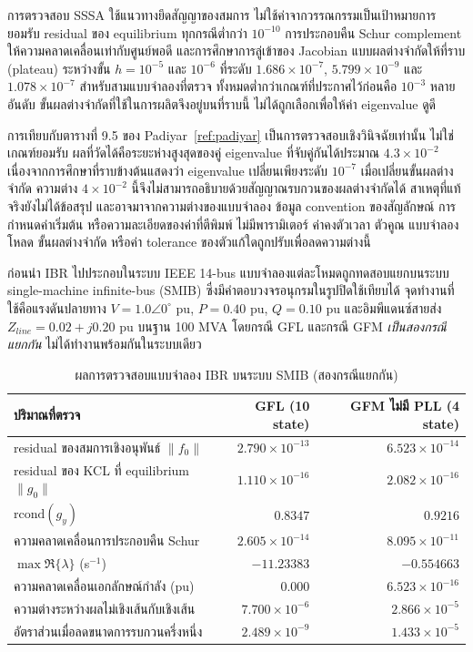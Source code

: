 \documentclass[12pt,a4paper]{article}
\newcommand{\templatesubheading}[1]{%
  \vspace{0.35em}\noindent{\color{academicblue}\rule{0.055\textwidth}{1.4pt}\hspace{0.45em}\fontsize{20}{22}\selectfont\bfseries #1}\par\vspace{0.12em}}
\newcommand{\tableheader}{\rowcolor{tablehead}}
\begin{document}
การตรวจสอบ SSSA ใช้แนวทางยึดสัญญาของสมการ ไม่ใช้ค่าจากวรรณกรรมเป็นเป้าหมายการยอมรับ
residual ของ equilibrium ทุกกรณีต่ำกว่า $10^{-10}$ การประกอบคืน Schur complement ให้ความคลาดเคลื่อนเท่ากับศูนย์พอดี และการศึกษาการลู่เข้าของ Jacobian แบบผลต่างจำกัดให้ที่ราบ (plateau) ระหว่างขั้น $h=10^{-5}$ และ $10^{-6}$ ที่ระดับ $1.686\times10^{-7}$, $5.799\times10^{-9}$ และ $1.078\times10^{-7}$ สำหรับสามแบบจำลองที่ตรวจ ทั้งหมดต่ำกว่าเกณฑ์ที่ประกาศไว้ก่อนคือ $10^{-3}$ หลายอันดับ ขั้นผลต่างจำกัดที่ใช้ในการผลิตจึงอยู่บนที่ราบนี้ ไม่ได้ถูกเลือกเพื่อให้ค่า eigenvalue ดูดี

การเทียบกับตารางที่ 9.5 ของ Padiyar~\ref{ref:padiyar} เป็นการตรวจสอบเชิงวินิจฉัยเท่านั้น ไม่ใช่เกณฑ์ยอมรับ ผลที่วัดได้คือระยะห่างสูงสุดของคู่ eigenvalue ที่จับคู่กันได้ประมาณ $4.3\times10^{-2}$ เนื่องจากการศึกษาที่ราบข้างต้นแสดงว่า eigenvalue เปลี่ยนเพียงระดับ $10^{-7}$ เมื่อเปลี่ยนขั้นผลต่างจำกัด ความต่าง $4\times10^{-2}$ นี้จึงไม่สามารถอธิบายด้วยสัญญาณรบกวนของผลต่างจำกัดได้ สาเหตุที่แท้จริงยังไม่ได้ข้อสรุป และอาจมาจากความต่างของแบบจำลอง ข้อมูล convention ของสัญลักษณ์ การกำหนดค่าเริ่มต้น หรือความละเอียดของค่าที่ตีพิมพ์ ไม่มีพารามิเตอร์ ค่าคงตัวเวลา ตัวคูณ แบบจำลองโหลด ขั้นผลต่างจำกัด หรือค่า tolerance ของตัวแก้ใดถูกปรับเพื่อลดความต่างนี้

\templatesubheading{13. การทดสอบแบบจำลอง IBR บนระบบ SMIB}
ก่อนนำ IBR ไปประกอบในระบบ IEEE 14-bus แบบจำลองแต่ละโหมดถูกทดสอบแยกบนระบบ single-machine infinite-bus (SMIB) ซึ่งมีคำตอบวงจรอนุกรมในรูปปิดใช้เทียบได้ จุดทำงานที่ใช้คือแรงดันปลายทาง $V=1.0\angle0^{\circ}$ pu, $P=0.40$ pu, $Q=0.10$ pu และอิมพีแดนซ์สายส่ง $Z_{line}=0.02+j0.20$ pu บนฐาน 100 MVA โดยกรณี GFL และกรณี GFM \emph{เป็นสองกรณีแยกกัน} ไม่ได้ทำงานพร้อมกันในระบบเดียว
\begin{table}[H]
\centering
\caption{ผลการตรวจสอบแบบจำลอง IBR บนระบบ SMIB (สองกรณีแยกกัน)}
\label{tab:smib}
\begin{tabularx}{0.99\textwidth}{@{}X r r@{}}
\toprule
\tableheader ปริมาณที่ตรวจ & GFL (10 state) & GFM ไม่มี PLL (4 state) \\
\midrule
residual ของสมการเชิงอนุพันธ์ $\|f_0\|$ & $2.790\times10^{-13}$ & $6.523\times10^{-14}$ \\
residual ของ KCL ที่ equilibrium $\|g_0\|$ & $1.110\times10^{-16}$ & $2.082\times10^{-16}$ \\
$\mathrm{rcond}(g_y)$ & $0.8347$ & $0.9216$ \\
ความคลาดเคลื่อนการประกอบคืน Schur & $2.605\times10^{-14}$ & $8.095\times10^{-11}$ \\
$\max\Re\{\lambda\}$ (s$^{-1}$) & $-11.23383$ & $-0.554663$ \\
ความคลาดเคลื่อนเอกลักษณ์กำลัง (pu) & $0.000$ & $6.523\times10^{-16}$ \\
ความต่างระหว่างผลไม่เชิงเส้นกับเชิงเส้น & $7.700\times10^{-6}$ & $2.866\times10^{-5}$ \\
อัตราส่วนเมื่อลดขนาดการรบกวนครึ่งหนึ่ง & $2.489\times10^{-9}$ & $1.433\times10^{-5}$ \\
\bottomrule
\end{tabularx}
\end{table}
\end{document}

